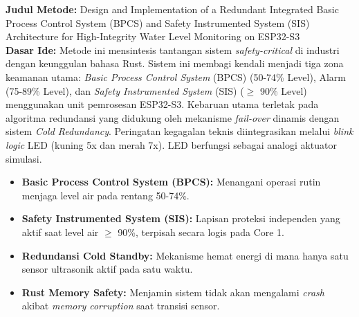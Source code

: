 \documentclass[12pt,a4paper]{article}
\begin{document}
\noindent \textbf{Judul Metode:} Design and Implementation of a Redundant Integrated Basic Process Control System (BPCS) and Safety Instrumented System (SIS) Architecture for High-Integrity Water Level Monitoring on ESP32-S3 \\[0.5em]

\noindent \textbf{Dasar Ide:} Metode ini mensintesis tantangan sistem \textit{safety-critical} di industri dengan keunggulan bahasa Rust. Sistem ini membagi kendali menjadi tiga zona keamanan utama: \textit{Basic Process Control System} (BPCS) (50-74\% Level), Alarm (75-89\% Level), dan \textit{Safety Instrumented System} (SIS) ($\geq$ 90\% Level) menggunakan unit pemrosesan ESP32-S3. Kebaruan utama terletak pada algoritma redundansi yang didukung oleh mekanisme \textit{fail-over} dinamis dengan sistem \textit{Cold Redundancy}. Peringatan kegagalan teknis diintegrasikan melalui \textit{blink logic} LED (kuning 5x dan merah 7x). LED berfungsi sebagai analogi aktuator simulasi.

\begin{itemize}
    \item \textbf{Basic Process Control System (BPCS):} Menangani operasi rutin menjaga level air pada rentang 50-74\%.
    \item \textbf{Safety Instrumented System (SIS):} Lapisan proteksi independen yang aktif saat level air $\geq$ 90\%, terpisah secara logis pada Core 1.
    \item \textbf{Redundansi Cold Standby:} Mekanisme hemat energi di mana hanya satu sensor ultrasonik aktif pada satu waktu.
    \item \textbf{Rust Memory Safety:} Menjamin sistem tidak akan mengalami \textit{crash} akibat \textit{memory corruption} saat transisi sensor.
\end{itemize}
\end{document}
